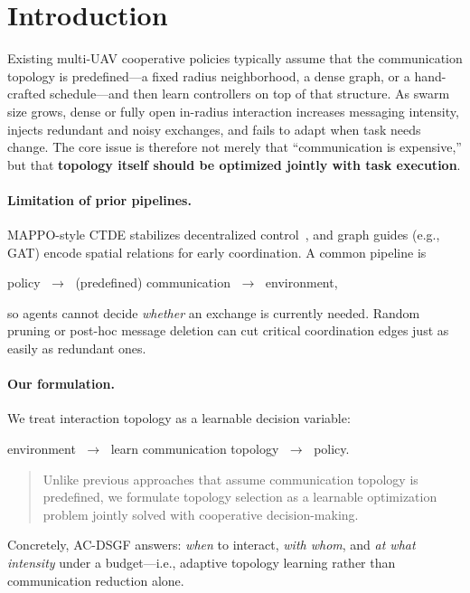 
\section{Introduction}
\label{sec:intro}

Existing multi-UAV cooperative policies typically assume that the
communication topology is predefined---a fixed radius neighborhood, a dense
graph, or a hand-crafted schedule---and then learn controllers on top of that
structure.
As swarm size grows, dense or fully open in-radius interaction increases
messaging intensity, injects redundant and noisy exchanges, and fails to
adapt when task needs change.
The core issue is therefore not merely that ``communication is expensive,''
but that \textbf{topology itself should be optimized jointly with task
execution}.

\paragraph{Limitation of prior pipelines.}
MAPPO-style CTDE stabilizes decentralized control~\cite{yu2022mappo}, and
graph guides (e.g., GAT) encode spatial relations for early coordination.
A common pipeline is
\begin{center}
policy $\;\rightarrow\;$ (predefined) communication $\;\rightarrow\;$ environment,
\end{center}
so agents cannot decide \emph{whether} an exchange is currently needed.
Random pruning or post-hoc message deletion can cut critical coordination
edges just as easily as redundant ones.

\paragraph{Our formulation.}
We treat interaction topology as a learnable decision variable:
\begin{center}
environment $\;\rightarrow\;$ learn communication topology $\;\rightarrow\;$ policy.
\end{center}
\begin{quote}
Unlike previous approaches that assume communication topology is predefined,
we formulate topology selection as a learnable optimization problem jointly
solved with cooperative decision-making.
\end{quote}
Concretely, AC-DSGF answers: \emph{when} to interact, \emph{with whom}, and
\emph{at what intensity} under a budget---i.e., adaptive topology learning
rather than communication reduction alone.

